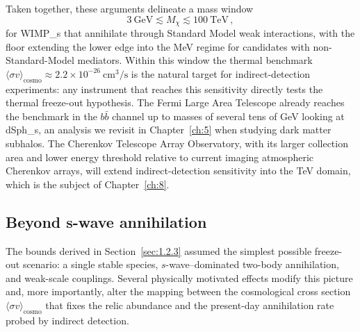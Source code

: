 Taken together, these arguments delineate a mass window
\begin{equation}
	3~\mathrm{GeV} \lesssim M_\chi \lesssim 100~\mathrm{TeV}\,,
	\label{eq:wimp_window}
\end{equation}
for \glspl{WIMP_} that annihilate through Standard Model weak interactions, with the \BBN floor extending the lower edge into the MeV regime for candidates with non-Standard-Model mediators.
Within this window the thermal benchmark $\langle \sigma v \rangle_\mathrm{cosmo} \approx 2.2 \times 10^{-26}~\mathrm{cm}^3/\mathrm{s}$ is the natural target for indirect-detection experiments: any instrument that reaches this sensitivity directly tests the thermal freeze-out hypothesis.
The Fermi Large Area Telescope already reaches the benchmark in the $b\bar b$ channel up to masses of several tens of GeV looking at \glspl{dSph_}, an analysis we revisit in Chapter~\ref{ch:5} when studying dark matter subhalos. The Cherenkov Telescope Array Observatory, with its larger collection area and lower energy threshold relative to current imaging atmospheric Cherenkov arrays, will extend indirect-detection sensitivity into the TeV domain, which is the subject of Chapter~\ref{ch:8}.

\subsection{Beyond s-wave annihilation}
\label{sec:1.2.4}

The bounds derived in Section~\ref{sec:1.2.3} assumed the simplest possible freeze-out scenario: a single stable species, $s$-wave--dominated two-body annihilation, and weak-scale couplings.
Several physically motivated effects modify this picture and, more importantly, alter the mapping between the cosmological cross section $\langle\sigma v\rangle_\mathrm{cosmo}$ that fixes the relic abundance and the present-day annihilation rate probed by indirect detection.

